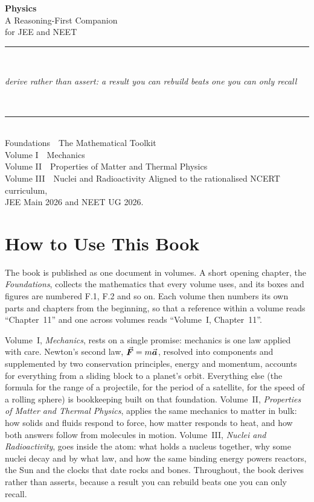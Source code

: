 \thispagestyle{empty}
\begin{center}
\vspace*{3.2cm}
{\Huge\bfseries Physics}\\[6mm]
{\Large A Reasoning-First Companion}\\[4mm]
{\large for JEE and NEET}\\[14mm]
{\color{rulegrey}\rule{0.5\textwidth}{0.9pt}}\\[8mm]
\begin{minipage}{0.76\textwidth}\centering\large\itshape
derive rather than assert: a result you can rebuild beats one you can only recall
\end{minipage}\\[14mm]
{\color{rulegrey}\rule{0.5\textwidth}{0.4pt}}\\[12mm]
{\normalsize
Foundations\ \ The Mathematical Toolkit\\[4mm]
Volume I\ \ Mechanics\\[2mm]
Volume II\ \ Properties of Matter and Thermal Physics\\[2mm]
Volume III\ \ Nuclei and Radioactivity}
\vfill
{\small Aligned to the rationalised NCERT curriculum,\\
JEE Main 2026 and NEET UG 2026.}
\vspace{2cm}
\end{center}
\cleardoublepage

\chapter*{How to Use This Book}

The book is published as one document in volumes. A short opening chapter, the \emph{Foundations},
collects the mathematics that every volume uses, and its boxes and figures are numbered F.1, F.2 and so
on. Each volume then numbers its own parts and chapters from the beginning, so that a reference within
a volume reads ``Chapter~11'' and one across volumes reads ``Volume~I, Chapter~11''. %

Volume~I, \emph{Mechanics}, rests on a single promise: mechanics is one law applied with care. Newton's
second law, $\vec{\bm{F}}=m\vec{\bm{a}}$, resolved into components and supplemented by two conservation principles,
energy and momentum, accounts for everything from a sliding block to a planet's orbit. Everything else
(the formula for the range of a projectile, for the period of a satellite, for the speed of a rolling
sphere) is bookkeeping built on that foundation. Volume~II, \emph{Properties of Matter and Thermal
Physics}, applies the same mechanics to matter in bulk: how solids and fluids respond to force, how
matter responds to heat, and how both answers follow from molecules in motion. Volume~III, \emph{Nuclei
and Radioactivity}, goes inside the atom: what holds a nucleus together, why some nuclei decay and by
what law, and how the same binding energy powers reactors, the Sun and the clocks that date rocks and
bones. Throughout, the book
derives rather than asserts, because a result you can rebuild beats one you can only recall.

